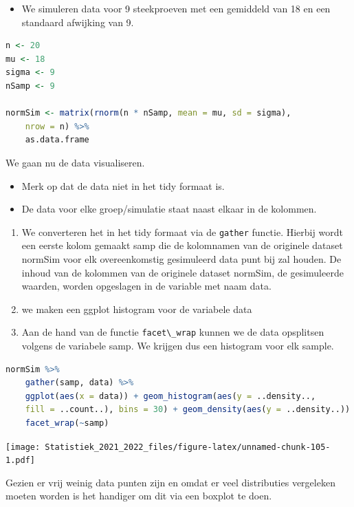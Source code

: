 \documentclass[
  12pt,dutch,coursenotes]{book}
\newcommand{\passthrough}[1]{#1}
\providecommand{\tightlist}{%
  \setlength{\itemsep}{0pt}\setlength{\parskip}{0pt}}
\theoremstyle{definition}
\theoremstyle{definition}
\theoremstyle{definition}
\theoremstyle{definition}
\theoremstyle{remark}
\begin{document}
\begin{itemize}
\tightlist
\item
  We simuleren data voor 9 steekproeven met een gemiddeld van 18 en een standaard afwijking van 9.
\end{itemize}

\begin{lstlisting}[language=R]
n <- 20
mu <- 18
sigma <- 9
nSamp <- 9

normSim <- matrix(rnorm(n * nSamp, mean = mu, sd = sigma),
    nrow = n) %>%
    as.data.frame
\end{lstlisting}

We gaan nu de data visualiseren.

\begin{itemize}
\tightlist
\item
  Merk op dat de data niet in het tidy formaat is.
\item
  De data voor elke groep/simulatie staat naast elkaar in de kolommen.
\end{itemize}

\begin{enumerate}
\def\labelenumi{\arabic{enumi}.}
\item
  We converteren het in het tidy formaat via de \passthrough{\lstinline!gather!} functie. Hierbij wordt een eerste kolom gemaakt samp die de kolomnamen van de originele dataset normSim voor elk overeenkomstig gesimuleerd data punt bij zal houden. De inhoud van de kolommen van de originele dataset normSim, de gesimuleerde waarden, worden opgeslagen in de variable met naam data.
\item
  we maken een ggplot histogram voor de variabele data
\item
  Aan de hand van de functie \passthrough{\lstinline!facet\_wrap!} kunnen we de data opsplitsen volgens de variabele samp. We krijgen dus een histogram voor elk sample.
\end{enumerate}

\begin{lstlisting}[language=R]
normSim %>%
    gather(samp, data) %>%
    ggplot(aes(x = data)) + geom_histogram(aes(y = ..density..,
    fill = ..count..), bins = 30) + geom_density(aes(y = ..density..)) +
    facet_wrap(~samp)
\end{lstlisting}

\texttt{[image: Statistiek\_2021\_2022\_files/figure-latex/unnamed-chunk-105-1.pdf]}

Gezien er vrij weinig data punten zijn en omdat er veel distributies vergeleken moeten worden is het handiger om dit via een boxplot te doen.
\end{document}
